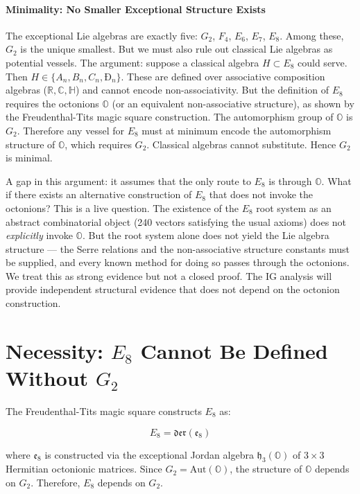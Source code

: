 \documentclass[12pt,a4paper]{article}
\begin{document}
\paragraph{Minimality: No Smaller Exceptional Structure Exists}

The exceptional Lie algebras are exactly five: $G_2$, $F_4$, $E_6$, $E_7$, $E_8$. Among these, $G_2$ is the unique smallest. But we must also rule out classical Lie algebras as potential vessels. The argument: suppose a classical algebra $H \subset E_8$ could serve. Then $H \in \{A_n, B_n, C_n, Ð_n\}$. These are defined over associative composition algebras ($\mathbb{R}, \mathbb{C}, \mathbb{H}$) and cannot encode non-associativity. But the definition of $E_8$ requires the octonions $\mathbb{O}$ (or an equivalent non-associative structure), as shown by the Freudenthal-Tits magic square construction. The automorphism group of $\mathbb{O}$ is $G_2$. Therefore any vessel for $E_8$ must at minimum encode the automorphism structure of $\mathbb{O}$, which requires $G_2$. Classical algebras cannot substitute. Hence $G_2$ is minimal.

A gap in this argument: it assumes that the only route to $E_8$ is through $\mathbb{O}$. What if there exists an alternative construction of $E_8$ that does not invoke the octonions? This is a live question. The existence of the $E_8$ root system as an abstract combinatorial object (240 vectors satisfying the usual axioms) does not \emph{explicitly} invoke $\mathbb{O}$. But the root system alone does not yield the Lie algebra structure --- the Serre relations and the non-associative structure constants must be supplied, and every known method for doing so passes through the octonions. We treat this as strong evidence but not a closed proof. The IG analysis will provide independent structural evidence that does not depend on the octonion construction.

\section{Necessity: $E_8$ Cannot Be Defined Without $G_2$}

The Freudenthal-Tits magic square constructs $E_8$ as:

\[E_8 = \mathfrak{der}(\mathfrak{e}_8)\]

where $\mathfrak{e}_8$ is constructed via the exceptional Jordan algebra $\mathfrak{h}_3(\mathbb{O})$ of $3 \times 3$ Hermitian octonionic matrices. Since $G_2 = \text{Aut}(\mathbb{O})$, the structure of $\mathbb{O}$ depends on $G_2$. Therefore, $E_8$ depends on $G_2$.
\end{document}
